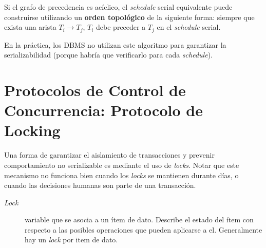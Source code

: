\documentclass[a4paper, twoside]{article}
\begin{document}
Si el grafo de precedencia es acíclico, el \emph{schedule} serial equivalente puede construirse utilizando un \textbf{orden topológico} de la siguiente forma: siempre que exista una arista $T_{i}\to T_{j}$, $T_{i}$ debe preceder a $T_{j}$ en el \emph{schedule }serial.

En la práctica, los DBMS no utilizan este algoritmo para garantizar la serializabilidad (porque habría que verificarlo para cada \emph{schedule}).

\section{Protocolos de Control de Concurrencia: Protocolo de Locking}

Una forma de garantizar el aislamiento de transacciones y prevenir comportamiento no serializable es mediante el uso de \emph{locks}. Notar que este mecanismo no funciona bien cuando los \emph{locks} se mantienen durante días, o cuando las decisiones humanas son parte de una transacción.
\begin{description}
	\item[\emph{Lock}] variable que se asocia a un ítem de dato. Describe el estado del ítem con respecto a las posibles operaciones que pueden aplicarse a el. Generalmente hay un \emph{lock} por item de dato.
\end{description}
\end{document}
